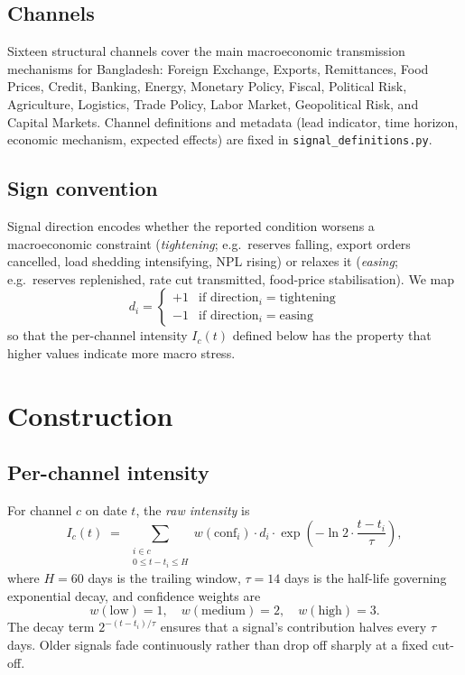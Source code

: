 \documentclass[11pt, a4paper]{article}
\begin{document}
\subsection{Channels}

Sixteen structural channels cover the main macroeconomic transmission
mechanisms for Bangladesh:
Foreign Exchange, Exports, Remittances, Food Prices, Credit, Banking,
Energy, Monetary Policy, Fiscal, Political Risk, Agriculture,
Logistics, Trade Policy, Labor Market, Geopolitical Risk, and
Capital Markets. Channel definitions and metadata (lead indicator,
time horizon, economic mechanism, expected effects) are fixed in
\texttt{signal\_definitions.py}.

\subsection{Sign convention}

Signal direction encodes whether the reported condition worsens a
macroeconomic constraint (\textit{tightening}; e.g.\ reserves falling,
export orders cancelled, load shedding intensifying, NPL rising) or
relaxes it (\textit{easing}; e.g.\ reserves replenished, rate cut
transmitted, food-price stabilisation). We map
\[
  d_i = \begin{cases}
    +1 & \text{if direction}_i = \text{tightening} \\
    -1 & \text{if direction}_i = \text{easing}
  \end{cases}
\]
so that the per-channel intensity $I_c(t)$ defined below has the
property that higher values indicate more macro stress.

\section{Construction}

\subsection{Per-channel intensity}

For channel $c$ on date $t$, the \textit{raw intensity} is
\begin{equation}
  I_c(t) \;=\; \sum_{\substack{i \in c \\ 0 \le t - t_i \le H}}
               w(\text{conf}_i) \cdot d_i \cdot
               \exp\!\left(-\ln 2 \cdot \frac{t - t_i}{\tau}\right),
  \label{eq:intensity}
\end{equation}
where $H = 60$ days is the trailing window, $\tau = 14$ days is the
half-life governing exponential decay, and confidence weights are
\[
  w(\text{low}) = 1, \quad w(\text{medium}) = 2, \quad w(\text{high}) = 3.
\]
The decay term $2^{-(t - t_i)/\tau}$ ensures that a signal's
contribution halves every $\tau$ days. Older signals fade
continuously rather than drop off sharply at a fixed cut-off.
\end{document}
